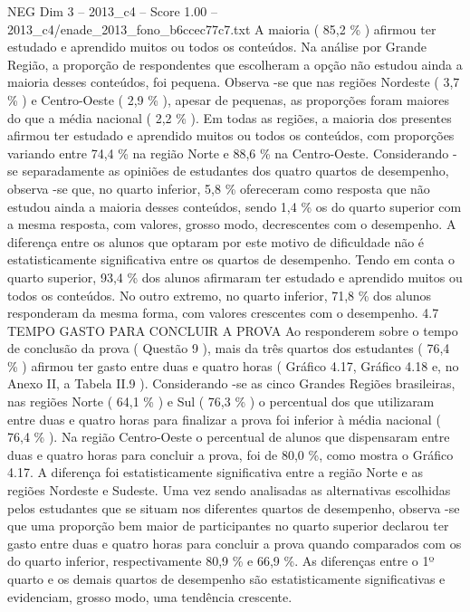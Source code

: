 \begin{textsample}{NEG Dim 3 – 2013\_c4 – Score 1.00 – 2013\_c4/enade\_2013\_fono\_b6ccec77c7.txt}
A maioria ( 85,2 \% ) afirmou ter estudado e aprendido muitos ou todos os conteúdos.
Na análise por Grande Região, a proporção de respondentes que escolheram a opção não estudou ainda a maioria desses conteúdos, foi pequena.
Observa -se que nas regiões Nordeste ( 3,7 \% ) e Centro-Oeste ( 2,9 \% ), apesar de pequenas, as proporções foram maiores do que a média nacional ( 2,2 \% ).
Em todas as regiões, a maioria dos presentes afirmou ter estudado e aprendido muitos ou todos os conteúdos, com proporções variando entre 74,4 \% na região Norte e 88,6 \% na Centro-Oeste.
Considerando -se separadamente as opiniões de estudantes dos quatro quartos de desempenho, observa -se que, no quarto inferior, 5,8 \% ofereceram como resposta que não estudou ainda a maioria desses conteúdos, sendo 1,4 \% os do quarto superior com a mesma resposta, com valores, grosso modo, decrescentes com o desempenho.
A diferença entre os alunos que optaram por este motivo de dificuldade não é estatisticamente significativa entre os quartos de desempenho.
Tendo em conta o quarto superior, 93,4 \% dos alunos afirmaram ter estudado e aprendido muitos ou todos os conteúdos.
No outro extremo, no quarto inferior, 71,8 \% dos alunos responderam da mesma forma, com valores crescentes com o desempenho. 4.7 TEMPO GASTO PARA CONCLUIR A PROVA Ao responderem sobre o tempo de conclusão da prova ( Questão 9 ), mais da três quartos dos estudantes ( 76,4 \% ) afirmou ter gasto entre duas e quatro horas ( Gráfico 4.17, Gráfico 4.18 e, no Anexo II, a Tabela II.9 ).
Considerando -se as cinco Grandes Regiões brasileiras, nas regiões Norte ( 64,1 \% ) e Sul ( 76,3 \% ) o percentual dos que utilizaram entre duas e quatro horas para finalizar a prova foi inferior à média nacional ( 76,4 \% ).
Na região Centro-Oeste o percentual de alunos que dispensaram entre duas e quatro horas para concluir a prova, foi de 80,0 \%, como mostra o Gráfico 4.17.
A diferença foi estatisticamente significativa entre a região Norte e as regiões Nordeste e Sudeste.
Uma vez sendo analisadas as alternativas escolhidas pelos estudantes que se situam nos diferentes quartos de desempenho, observa -se que uma proporção bem maior de participantes no quarto superior declarou ter gasto entre duas e quatro horas para concluir a prova quando comparados com os do quarto inferior, respectivamente 80,9 \% e 66,9 \%.
As diferenças entre o 1º quarto e os demais quartos de desempenho são estatisticamente significativas e evidenciam, grosso modo, uma tendência crescente.

\end{textsample}

